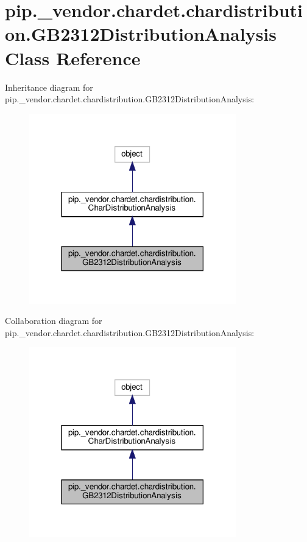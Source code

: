 \hypertarget{classpip_1_1__vendor_1_1chardet_1_1chardistribution_1_1GB2312DistributionAnalysis}{}\section{pip.\+\_\+vendor.\+chardet.\+chardistribution.\+G\+B2312\+Distribution\+Analysis Class Reference}
\label{classpip_1_1__vendor_1_1chardet_1_1chardistribution_1_1GB2312DistributionAnalysis}


Inheritance diagram for pip.\+\_\+vendor.\+chardet.\+chardistribution.\+G\+B2312\+Distribution\+Analysis\+:
\nopagebreak
\begin{figure}[H]
\begin{center}
\leavevmode
\includegraphics[width=254pt]{classpip_1_1__vendor_1_1chardet_1_1chardistribution_1_1GB2312DistributionAnalysis__inherit__graph}
\end{center}
\end{figure}


Collaboration diagram for pip.\+\_\+vendor.\+chardet.\+chardistribution.\+G\+B2312\+Distribution\+Analysis\+:
\nopagebreak
\begin{figure}[H]
\begin{center}
\leavevmode
\includegraphics[width=254pt]{classpip_1_1__vendor_1_1chardet_1_1chardistribution_1_1GB2312DistributionAnalysis__coll__graph}
\end{center}
\end{figure}
